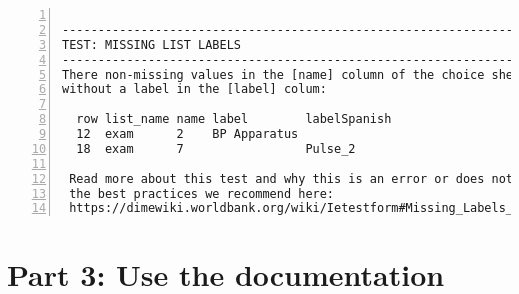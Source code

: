 \documentclass{tufte-handout}
\begin{document}
	\begin{minipage}{1.5\textwidth}
	 	\vspace{.5cm}
	 	\begin{Verbatim}[frame=lines,
	 					numbers=left,
	 					label=ietestform-test-section-example,
	 					samepage=true,
	 					baselinestretch=0.75]
	 	
----------------------------------------------------------------------
TEST: MISSING LIST LABELS
----------------------------------------------------------------------
There non-missing values in the [name] column of the choice sheet 
without a label in the [label] colum:
 
  row list_name name label        labelSpanish 
  12  exam      2    BP Apparatus 
  18  exam      7                 Pulse_2
 
 Read more about this test and why this is an error or does not follow 
 the best practices we recommend here:
 https://dimewiki.worldbank.org/wiki/Ietestform#Missing_Labels_or_Value.2FName_in_Choice_Lists

		\end{Verbatim}
		\vspace{.3cm}
	\end{minipage}



\section{Part 3: Use the documentation}
\end{document}
